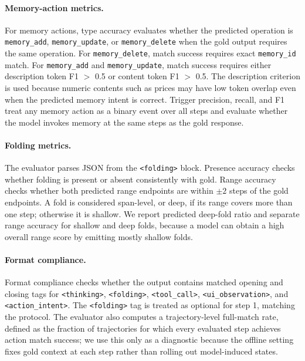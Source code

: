 \paragraph{Memory-action metrics.}
For memory actions, type accuracy evaluates whether the predicted operation is \texttt{memory\_add}, \texttt{memory\_update}, or \texttt{memory\_delete} when the gold output requires the same operation. For \texttt{memory\_delete}, match success requires exact \texttt{memory\_id} match. For \texttt{memory\_add} and \texttt{memory\_update}, match success requires either description token F1 $>$ 0.5 or content token F1 $>$ 0.5. The description criterion is used because numeric contents such as prices may have low token overlap even when the predicted memory intent is correct. Trigger precision, recall, and F1 treat any memory action as a binary event over all steps and evaluate whether the model invokes memory at the same steps as the gold response.

\paragraph{Folding metrics.}
The evaluator parses JSON from the \texttt{<folding>} block. Presence accuracy checks whether folding is present or absent consistently with gold. Range accuracy checks whether both predicted range endpoints are within $\pm2$ steps of the gold endpoints. A fold is considered span-level, or deep, if its range covers more than one step; otherwise it is shallow. We report predicted deep-fold ratio and separate range accuracy for shallow and deep folds, because a model can obtain a high overall range score by emitting mostly shallow folds.

\paragraph{Format compliance.}
Format compliance checks whether the output contains matched opening and closing tags for \texttt{<thinking>}, \texttt{<folding>}, \texttt{<tool\_call>}, \texttt{<ui\_observation>}, and \texttt{<action\_intent>}. The \texttt{<folding>} tag is treated as optional for step 1, matching the \conact protocol. The evaluator also computes a trajectory-level full-match rate, defined as the fraction of trajectories for which every evaluated step achieves action match success; we use this only as a diagnostic because the offline setting fixes gold context at each step rather than rolling out model-induced states.

